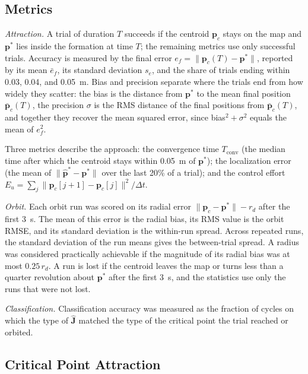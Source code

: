 \subsection{Metrics}
\label{sec:ch6:metrics}

\emph{Attraction.} A trial of duration $T$ succeeds if the centroid $\mathbf{p}_c$ stays on the map and $\mathbf{p}^*$ lies inside the formation at time $T$; the remaining metrics use only successful trials. Accuracy is measured by the final error $e_f = \|\mathbf{p}_c(T) - \mathbf{p}^*\|$, reported by its mean $\bar{e}_f$, its standard deviation $s_e$, and the share of trials ending within 0.03, 0.04, and 0.05~m. Bias and precision separate where the trials end from how widely they scatter: the bias is the distance from $\mathbf{p}^*$ to the mean final position $\bar{\mathbf{p}}_c(T)$, the precision $\sigma$ is the RMS distance of the final positions from $\bar{\mathbf{p}}_c(T)$, and together they recover the mean squared error, since bias$^2 + \sigma^2$ equals the mean of $e_f^2$.

Three metrics describe the approach: the convergence time $T_{\mathrm{conv}}$ (the median time after which the centroid stays within 0.05~m of $\mathbf{p}^*$); the localization error (the mean of $\|\hat{\mathbf{p}}^* - \mathbf{p}^*\|$ over the last 20\% of a trial); and the control effort $E_u = \sum_j \|\mathbf{p}_c[j+1] - \mathbf{p}_c[j]\|^2/\Delta t$.

\emph{Orbit.} Each orbit run was scored on its radial error $\|\mathbf{p}_c - \mathbf{p}^*\| - r_d$ after the first 3~s. The mean of this error is the radial bias, its RMS value is the orbit RMSE, and its standard deviation is the within-run spread. Across repeated runs, the standard deviation of the run means gives the between-trial spread. A radius was considered practically achievable if the magnitude of its radial bias was at most $0.25\,r_d$. A run is lost if the centroid leaves the map or turns less than a quarter revolution about $\mathbf{p}^*$ after the first 3~s, and the statistics use only the runs that were not lost.

\emph{Classification.} Classification accuracy was measured as the fraction of cycles on which the type of $\hat{\mathbf{J}}$ matched the type of the critical point the trial reached or orbited.

\subsection{Critical Point Attraction}
\label{sec:ch6:sim_attraction}

